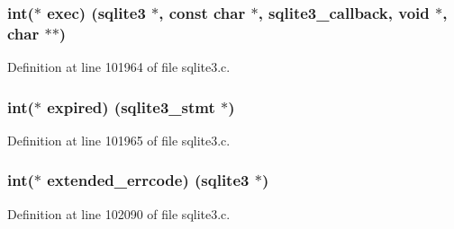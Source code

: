 \hypertarget{structsqlite3__api__routines_ac07c98ed980b0f1f7f1c1b6c95390f66}{}
\subsubsection[{exec}]{\setlength{\rightskip}{0pt plus 5cm}int($\ast$ exec) ({\bf sqlite3} $\ast$, const char $\ast$, {\bf sqlite3\+\_\+callback}, void $\ast$, char $\ast$$\ast$)}\label{structsqlite3__api__routines_ac07c98ed980b0f1f7f1c1b6c95390f66}


Definition at line 101964 of file sqlite3.\+c.

\hypertarget{structsqlite3__api__routines_a9c5e16f9d478ad089c7ddb2320ce52e9}{}
\subsubsection[{expired}]{\setlength{\rightskip}{0pt plus 5cm}int($\ast$ expired) ({\bf sqlite3\+\_\+stmt} $\ast$)}\label{structsqlite3__api__routines_a9c5e16f9d478ad089c7ddb2320ce52e9}


Definition at line 101965 of file sqlite3.\+c.

\hypertarget{structsqlite3__api__routines_aa890ed7620f82f9380420e7ba9ebecca}{}
\subsubsection[{extended\+\_\+errcode}]{\setlength{\rightskip}{0pt plus 5cm}int($\ast$ extended\+\_\+errcode) ({\bf sqlite3} $\ast$)}\label{structsqlite3__api__routines_aa890ed7620f82f9380420e7ba9ebecca}


Definition at line 102090 of file sqlite3.\+c.

\hypertarget{structsqlite3__api__routines_a96808678170875483108bb329d07e025}{}
